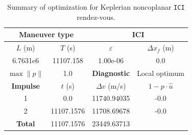 \begin{table}[htpb]
    \centering
    \begin{tabular}{cccc} \toprule
    \multicolumn{2}{c}{\textbf{Maneuver type}} & \multicolumn{2}{c}{ICI} \\ \midrule
    \(L\) (m) & \(T\) (s) & \(\varepsilon\) & \(\Delta x_{f}\) (m)    \\ \midrule
    6.7631e6          & 11107.158          & 1.00e-06                & 0.0                        \\ \midrule
    \(\max \lVert p \rVert\) & 1.0     & \textbf{Diagnostic}   & Local optimum        \\ \midrule
    \textbf{Impulse} & \(t\) (s) & \(\Delta v\) (m/s) & \(1 - p \cdot \hat{u}\) \\ \midrule
    1                 & 0.0          & 11740.94035             & -0.0                    \\
    2                 & 11107.1576          & 11708.69678             & -0.0                    \\\midrule
    \textbf{Total}   & 11107.1576          & 23449.63713             &                     \\ \bottomrule   
    \end{tabular}
    \caption{Summary of optimization for Keplerian noncoplanar \texttt{ICI} rendez-vous.}
    \label{tab:tb_ncop_ICI_tab}
\end{table}

